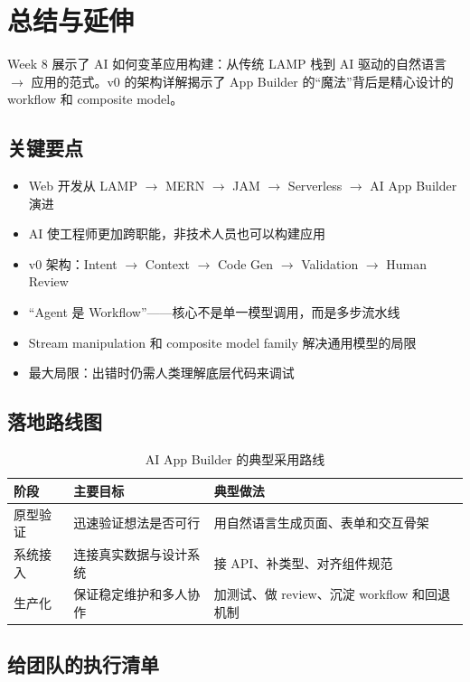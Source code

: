 \section{总结与延伸}

Week 8 展示了 AI 如何变革应用构建：从传统 LAMP 栈到 AI 驱动的自然语言 $\rightarrow$ 应用的范式。v0 的架构详解揭示了 App Builder 的``魔法''背后是精心设计的 workflow 和 composite model。

\subsection{关键要点}

\begin{itemize}
    \item Web 开发从 LAMP $\rightarrow$ MERN $\rightarrow$ JAM $\rightarrow$ Serverless $\rightarrow$ AI App Builder 演进
    \item AI 使工程师更加跨职能，非技术人员也可以构建应用
    \item v0 架构：Intent $\rightarrow$ Context $\rightarrow$ Code Gen $\rightarrow$ Validation $\rightarrow$ Human Review
    \item ``Agent 是 Workflow''——核心不是单一模型调用，而是多步流水线
    \item Stream manipulation 和 composite model family 解决通用模型的局限
    \item 最大局限：出错时仍需人类理解底层代码来调试
\end{itemize}

\subsection{落地路线图}

\begin{table}[H]
\centering
\begin{tabular}{p{} p{} p{}}
\toprule
阶段 & 主要目标 & 典型做法 \\
\midrule
原型验证 & 迅速验证想法是否可行 & 用自然语言生成页面、表单和交互骨架 \\
系统接入 & 连接真实数据与设计系统 & 接 API、补类型、对齐组件规范 \\
生产化 & 保证稳定维护和多人协作 & 加测试、做 review、沉淀 workflow 和回退机制 \\
\bottomrule
\end{tabular}
\caption{AI App Builder 的典型采用路线}
\end{table}

\subsection{给团队的执行清单}

